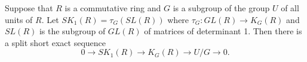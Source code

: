 Suppose that $R$ is a commutative ring and $G$ is a subgroup of the group $U$ of all units of $R$. Let $SK_1(R) = \tau_G(SL(R))$ where $\tau_G: GL(R) \rightarrow K_G(R)$ and $SL(R)$ is the subgroup of $GL(R)$ of matrices of determinant 1. Then there is a split short exact sequence
$$0 \rightarrow SK_1(R) \rightarrow K_G(R) \rightarrow U/G \rightarrow 0.$$
